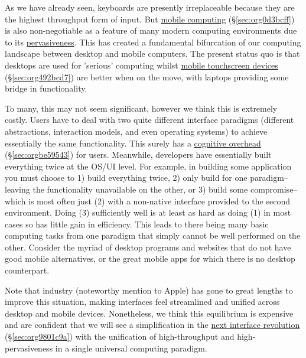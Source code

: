 \documentclass[logo,bsc,singlespacing,parskip]{infthesis}
\begin{document}
As we have already seen, keyboards are presently irreplaceable because they are the highest throughput form of input.
But \hyperref[sec:org0d3bcff]{mobile computing} (\S \ref{sec:org0d3bcff}) is also non-negotiable as a feature of many modern computing environments due to its \hyperref[pervasiveness]{pervasiveness}.
This has created a fundamental bifurcation of our computing landscape between desktop and mobile computers.
The present status quo is that desktops are used for 'serious' computing whilst \hyperref[sec:org492bcd7]{mobile touchscreen devices} (\S \ref{sec:org492bcd7}) are better when on the move, with laptops providing some bridge in functionality.

To many, this may not seem significant, however we think this is extremely costly.
Users have to deal with two quite different interface paradigms (different abstractions, interaction models, and even operating systems) to achieve essentially the same functionality.
This surely has a \hyperref[sec:orgbe59543]{cognitive overhead} (\S \ref{sec:orgbe59543}) for users.
Meanwhile, developers have essentially built everything twice at the OS/UI level.
For example, in building some application you must choose to 1) build everything twice, 2) only build for one paradigm-- leaving the functionality unavailable on the other, or 3) build some compromise-- which is most often just (2) with a non-native interface provided to the second environment.
Doing (3) sufficiently well is at least as hard as doing (1) in most cases so has little gain in efficiency.
This leads to there being many basic computing tasks from one paradigm that simply cannot be well performed on the other.
Consider the myriad of desktop programs and websites that do not have good mobile alternatives, or the great mobile apps for which there is no desktop counterpart.

Note that industry (noteworthy mention to Apple) has gone to great lengths to improve this situation, making interfaces feel streamlined and unified across desktop and mobile devices.
Nonetheless, we think this equilibrium is expensive and are confident that we will see a simplification in the \hyperref[sec:org9801c9a]{next interface revolution} (\S \ref{sec:org9801c9a}) with the unification of high-throughput and high-pervasiveness in a single universal computing paradigm.
\end{document}
